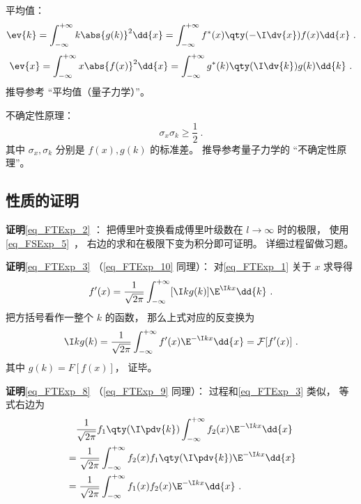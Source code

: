 平均值：
\begin{equation}
\ev{k} = \int_{-\infty}^{+\infty} k\abs{g(k)}^2 \dd{x} = \int_{-\infty}^{+\infty} f^*(x)\qty(-\I \dv{x}) f(x) \dd{x}~.
\end{equation}
\begin{equation}
\ev{x} = \int_{-\infty}^{+\infty} x\abs{f(x)}^2 \dd{x} = \int_{-\infty}^{+\infty} g^*(k)\qty(\I \dv{k}) g(k) \dd{k}~.
\end{equation}
推导参考 “平均值（量子力学）”。

不确定性原理：
\begin{equation}
\sigma_x \sigma_k \geqslant \frac{1}{2}~.
\end{equation}
其中 $\sigma_x, \sigma_k$ 分别是 $f(x), g(k)$ 的标准差。 推导参考量子力学的 “不确定性原理”。

\subsection{性质的证明}

\textbf{证明}\autoref{eq_FTExp_2} ： 把傅里叶变换看成傅里叶级数在 $l \to \infty$ 时的极限， 使用\autoref{eq_FSExp_5}~， 右边的求和在极限下变为积分即可证明。 详细过程留做习题。

\textbf{证明}\autoref{eq_FTExp_3} （\autoref{eq_FTExp_10} 同理）： 对\autoref{eq_FTExp_1} 关于 $x$ 求导得
\begin{equation}
f'(x) = \frac{1}{\sqrt{2\pi }} \int_{-\infty }^{+\infty } [\I kg(k)]\E^{\I kx} \dd{k}~.
\end{equation}
把方括号看作一整个 $k$ 的函数， 那么上式对应的反变换为
\begin{equation}
\I kg(k) = \frac{1}{\sqrt{2\pi }} \int_{-\infty }^{+\infty } f'(x) \E^{-\I kx} \dd{x} = \mathcal F [f'(x)]~.
\end{equation}
其中 $g(k) = F [f(x)]$， 证毕。

\textbf{证明}\autoref{eq_FTExp_8} （\autoref{eq_FTExp_9} 同理）： 过程和\autoref{eq_FTExp_3} 类似， 等式右边为
\begin{equation}
\begin{aligned}
& \quad \frac{1}{\sqrt{2\pi }} f_1\qty(\I \pdv{k}) \int_{-\infty }^{+\infty } f_2(x)\E^{-\I kx} \dd{x}\\
&= \frac{1}{\sqrt{2\pi }} \int_{-\infty }^{+\infty } f_2(x) f_1\qty(\I \pdv{k})\E^{-\I kx} \dd{x}\\
&= \frac{1}{\sqrt{2\pi }} \int_{-\infty }^{+\infty } f_1(x) f_2(x) \E^{-\I kx} \dd{x}~.
\end{aligned}
\end{equation}
